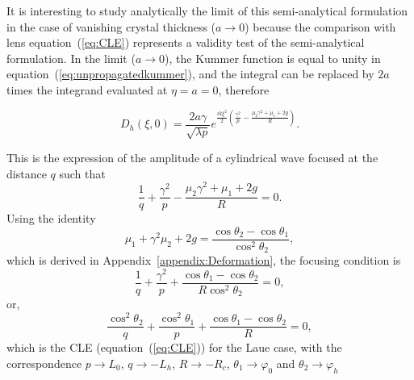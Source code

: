 \documentclass[preprint]{iucr}              %
\newcommand{\inred}[1]{{\color{red}#1}}
\begin{document}
\inred{It is interesting to study analytically the limit of this semi-analytical formulation in the case of}
vanishing crystal thickness ($a\rightarrow0{}$) \inred{because the comparison with lens equation~(\ref{eq:CLE}) represents a validity test of the semi-analytical formulation. 
In the limit ($a\rightarrow0{}$),}
the Kummer function is equal to unity in equation~(\ref{eq:unpropagatedkummer}), and the integral can be replaced by $2a$ times the integrand evaluated at $\eta=a=0$, therefore


\begin{equation}
\label{eq:14reduced}
    D_h(\xi,0) = \frac{2 a \gamma}{\sqrt{\lambda p}} e^{\frac{i k \xi^2}{2}(\frac{\gamma^2}{p}-\frac{\mu_2\gamma^2+\mu_1+2g}{R})}.
\end{equation}

This is the expression of the amplitude of a cylindrical wave focused at the distance $q$ such that
\begin{equation}
    \frac{1}{q}+\frac{\gamma^2}{p}-\frac{\mu_2\gamma^2+\mu_1+2g}{R}=0. 
\end{equation}
Using the identity
\begin{equation}
\label{eq:appendixIdentity}
    \mu_1+\gamma^2\mu_2+2g=\frac{\cos\theta_2-\cos\theta_1}{\cos^2\theta_2},
\end{equation}
which is \inred{derived} in Appendix~\ref{appendix:Deformation}, the focusing condition is 
\begin{equation}
    \frac{1}{q}+\frac{\gamma^2}{p}+\frac{\cos\theta_1-\cos\theta_2}{R\cos^2\theta_2}=0,
\end{equation}
or,
\begin{equation}
    \frac{\cos^2\theta_2}{q}+\frac{\cos^2\theta_1}{p}+\frac{\cos\theta_1-\cos\theta_2}{R}=0,
\end{equation}
which is the CLE (equation~(\ref{eq:CLE})) for the Laue case, with the correspondence $p \rightarrow L_0$, $q \rightarrow -L_h$, $R \rightarrow -R_c$, $\theta_1 \rightarrow \varphi_0$ and $\theta_2 \rightarrow \varphi_h$
\end{document}
